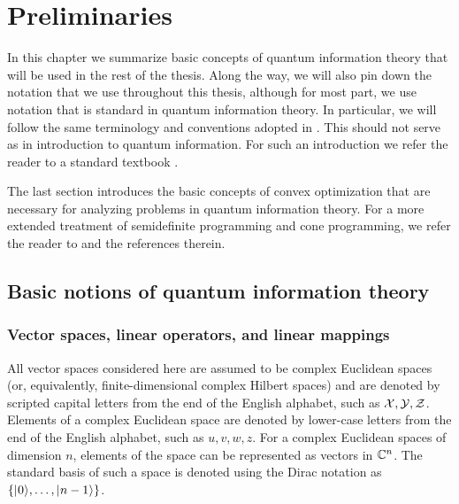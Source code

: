 \chapter{Preliminaries}
\label{chap:preliminaries}

In this chapter we summarize basic concepts of quantum information theory 
that will be used in the rest of the thesis.
Along the way, we will also pin down the notation that  
we use throughout this thesis, although for most part, 
we use notation that is standard in quantum information theory.
In particular, we will follow the same terminology and conventions adopted 
in \cite{Watrous15}.
This should not serve as in introduction to quantum information. For such
an introduction we refer the reader to a standard textbook \cite{Nielsen11}.

The last section introduces the basic concepts of convex optimization that are
necessary for analyzing problems in quantum information theory. 
For a more extended treatment of semidefinite programming and cone programming, 
we refer the reader to \cite{Wolkowicz00,Tuncel12} and the references therein.

\minitoc

\section{Basic notions of quantum information theory}
\label{sec:basic-notions-of-quantum-information-theory}

\subsection{Vector spaces, linear operators, and linear mappings}

All vector spaces considered here are assumed to be complex Euclidean spaces
(or, equivalently, finite-dimensional complex Hilbert spaces) and are denoted 
by scripted capital letters from the end of the English alphabet, 
such as $\mathcal{X}, \mathcal{Y}, \mathcal{Z}$.
Elements of a complex Euclidean space are denoted by lower-case letters
from the end of the English alphabet, such as $u, v, w, z$. For a complex
Euclidean spaces of dimension $n$, elements of the space can be represented as 
vectors in $\mathbb{C}^{n}$. 
The standard basis of such a space is denoted using the Dirac notation as
$\left\{ \lvert\mspace{0.5mu} 0 \mspace{0.5mu} \rangle, \ldots, \lvert\mspace{0.5mu} n-1 \mspace{0.5mu} \rangle \right\}$.

